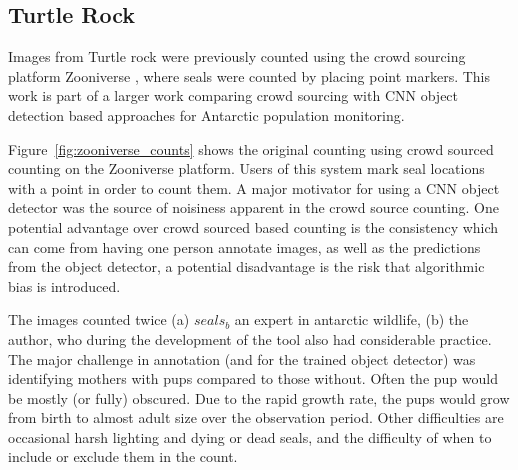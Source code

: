 \subsection{Turtle Rock \cite{Eisert2015}}
 
 Images from Turtle rock were previously counted using the crowd sourcing platform Zooniverse \cite{Zooniverse}, where seals were counted by placing point markers. This work is part of a larger work comparing crowd sourcing with \gls{CNN} object detection based approaches for Antarctic population monitoring. 
 
 Figure~\ref{fig:zooniverse_counts} shows the original counting using crowd sourced counting on the Zooniverse \cite{Zooniverse} platform. Users of this system mark seal locations with a point in order to count them. A major motivator for using a \gls{CNN} object detector was the source of noisiness apparent in the crowd source counting. One potential advantage over crowd sourced based counting is the consistency which can come from having one person annotate images, as well as the predictions from the object detector, a potential disadvantage is the risk that algorithmic bias is introduced.
 
 The images counted twice (a) $seals_b$ an expert in antarctic wildlife, (b) the author, who during the development of the tool also had considerable practice. The major challenge in annotation (and for the trained object detector) was identifying mothers with pups compared to those without. Often the pup would be mostly (or fully) obscured.  Due to the rapid growth rate, the pups would grow from birth to almost adult size over the observation period. Other difficulties are occasional harsh lighting and dying or dead seals, and the difficulty of when to include or exclude them in the count.

